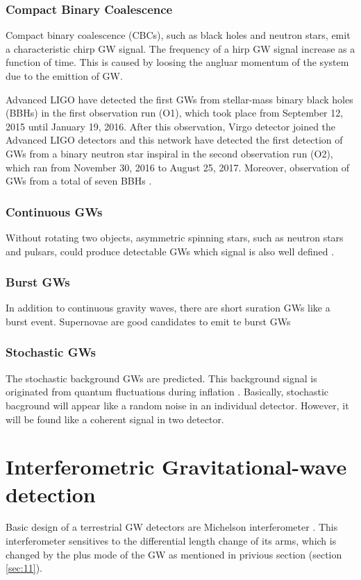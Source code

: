 \subsubsection{Compact Binary Coalescence}
Compact binary coalescence (CBCs), such as black holes and neutron stars, emit a characteristic chirp GW signal. The frequency of a hirp GW signal increase as a function of time. This is caused by loosing the angluar momentum of the system due to the emittion of GW. 

Advanced LIGO have detected the first GWs from stellar-mass binary black holes (BBHs) in the first observation run (O1), which took place from September 12, 2015 until January 19, 2016. After this observation, Virgo detector joined the Advanced LIGO detectors and this network have detected the first detection of GWs from a binary neutron star inspiral in the second observation run (O2), which ran from November 30, 2016 to August 25, 2017. Moreover, observation of GWs from a total of seven BBHs \cite{abbott2019gwtc}.

\subsubsection{Continuous GWs}
Without rotating two objects, asymmetric spinning stars, such as neutron stars and pulsars, could produce detectable GWs which signal is also well defined \cite{leaci2012searching,hereld1984search}.

\subsubsection{Burst GWs}
In addition to continuous gravity waves, there are short suration GWs like a burst event. Supernovae are good candidates to emit te burst GWs \cite{ott2004gravitational}

\subsubsection{Stochastic GWs}
The stochastic background GWs are predicted\cite{starobinskii1979spectrum,Christensen_2018}. This background signal is originated from quantum fluctuations during inflation \cite{PhysRevD.23.347}. Basically, stochastic bacground will appear like a random noise in an individual detector. However, it will be found like a coherent signal in two detector.



\section{Interferometric Gravitational-wave detection} \label{sec:12}
Basic design of a terrestrial GW detectors are Michelson interferometer \cite{weiss1972electronically}. This interferometer sensitives to the differential length change of its arms, which is changed by the plus mode of the GW as mentioned in privious section (section \ref{sec:11}).

